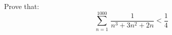Prove that:
\begin{equation*}
  \sum\limits_{n=1}^{1000} {\, \frac{1}{n^3 + 3 n^2 + 2n}}
  < \dfrac{1}{4}
\end{equation*}
